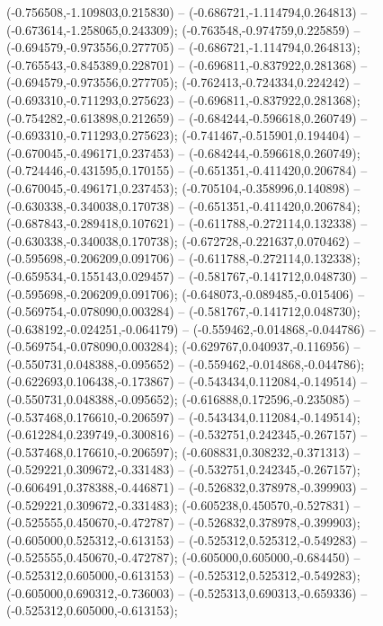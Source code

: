  (-0.756508,-1.109803,0.215830) -- (-0.686721,-1.114794,0.264813) -- (-0.673614,-1.258065,0.243309);
 (-0.763548,-0.974759,0.225859) -- (-0.694579,-0.973556,0.277705) -- (-0.686721,-1.114794,0.264813);
 (-0.765543,-0.845389,0.228701) -- (-0.696811,-0.837922,0.281368) -- (-0.694579,-0.973556,0.277705);
 (-0.762413,-0.724334,0.224242) -- (-0.693310,-0.711293,0.275623) -- (-0.696811,-0.837922,0.281368);
 (-0.754282,-0.613898,0.212659) -- (-0.684244,-0.596618,0.260749) -- (-0.693310,-0.711293,0.275623);
 (-0.741467,-0.515901,0.194404) -- (-0.670045,-0.496171,0.237453) -- (-0.684244,-0.596618,0.260749);
 (-0.724446,-0.431595,0.170155) -- (-0.651351,-0.411420,0.206784) -- (-0.670045,-0.496171,0.237453);
 (-0.705104,-0.358996,0.140898) -- (-0.630338,-0.340038,0.170738) -- (-0.651351,-0.411420,0.206784);
 (-0.687843,-0.289418,0.107621) -- (-0.611788,-0.272114,0.132338) -- (-0.630338,-0.340038,0.170738);
 (-0.672728,-0.221637,0.070462) -- (-0.595698,-0.206209,0.091706) -- (-0.611788,-0.272114,0.132338);
 (-0.659534,-0.155143,0.029457) -- (-0.581767,-0.141712,0.048730) -- (-0.595698,-0.206209,0.091706);
 (-0.648073,-0.089485,-0.015406) -- (-0.569754,-0.078090,0.003284) -- (-0.581767,-0.141712,0.048730);
 (-0.638192,-0.024251,-0.064179) -- (-0.559462,-0.014868,-0.044786) -- (-0.569754,-0.078090,0.003284);
 (-0.629767,0.040937,-0.116956) -- (-0.550731,0.048388,-0.095652) -- (-0.559462,-0.014868,-0.044786);
 (-0.622693,0.106438,-0.173867) -- (-0.543434,0.112084,-0.149514) -- (-0.550731,0.048388,-0.095652);
 (-0.616888,0.172596,-0.235085) -- (-0.537468,0.176610,-0.206597) -- (-0.543434,0.112084,-0.149514);
 (-0.612284,0.239749,-0.300816) -- (-0.532751,0.242345,-0.267157) -- (-0.537468,0.176610,-0.206597);
 (-0.608831,0.308232,-0.371313) -- (-0.529221,0.309672,-0.331483) -- (-0.532751,0.242345,-0.267157);
 (-0.606491,0.378388,-0.446871) -- (-0.526832,0.378978,-0.399903) -- (-0.529221,0.309672,-0.331483);
 (-0.605238,0.450570,-0.527831) -- (-0.525555,0.450670,-0.472787) -- (-0.526832,0.378978,-0.399903);
 (-0.605000,0.525312,-0.613153) -- (-0.525312,0.525312,-0.549283) -- (-0.525555,0.450670,-0.472787);
 (-0.605000,0.605000,-0.684450) -- (-0.525312,0.605000,-0.613153) -- (-0.525312,0.525312,-0.549283);
 (-0.605000,0.690312,-0.736003) -- (-0.525313,0.690313,-0.659336) -- (-0.525312,0.605000,-0.613153);
